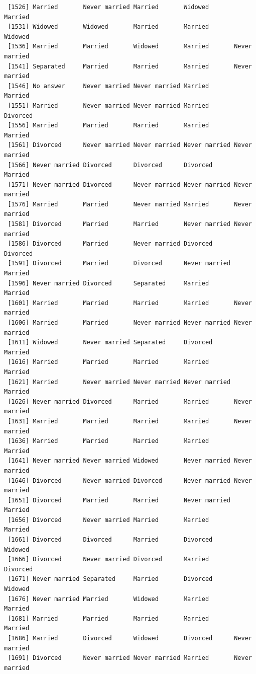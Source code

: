 \documentclass[
  letterpaper,
  DIV=11,
  numbers=noendperiod,
  oneside]{scrartcl}
\begin{document}
\begin{verbatim}
 [1526] Married       Never married Married       Widowed       Married      
 [1531] Widowed       Widowed       Married       Married       Widowed      
 [1536] Married       Married       Widowed       Married       Never married
 [1541] Separated     Married       Married       Married       Never married
 [1546] No answer     Never married Never married Married       Married      
 [1551] Married       Never married Never married Married       Divorced     
 [1556] Married       Married       Married       Married       Married      
 [1561] Divorced      Never married Never married Never married Never married
 [1566] Never married Divorced      Divorced      Divorced      Married      
 [1571] Never married Divorced      Never married Never married Never married
 [1576] Married       Married       Never married Married       Never married
 [1581] Divorced      Married       Married       Never married Never married
 [1586] Divorced      Married       Never married Divorced      Divorced     
 [1591] Divorced      Married       Divorced      Never married Married      
 [1596] Never married Divorced      Separated     Married       Married      
 [1601] Married       Married       Married       Married       Never married
 [1606] Married       Married       Never married Never married Never married
 [1611] Widowed       Never married Separated     Divorced      Married      
 [1616] Married       Married       Married       Married       Married      
 [1621] Married       Never married Never married Never married Married      
 [1626] Never married Divorced      Married       Married       Never married
 [1631] Married       Married       Married       Married       Never married
 [1636] Married       Married       Married       Married       Married      
 [1641] Never married Never married Widowed       Never married Never married
 [1646] Divorced      Never married Divorced      Never married Never married
 [1651] Divorced      Married       Married       Never married Married      
 [1656] Divorced      Never married Married       Married       Married      
 [1661] Divorced      Divorced      Married       Divorced      Widowed      
 [1666] Divorced      Never married Divorced      Married       Divorced     
 [1671] Never married Separated     Married       Divorced      Widowed      
 [1676] Never married Married       Widowed       Married       Married      
 [1681] Married       Married       Married       Married       Married      
 [1686] Married       Divorced      Widowed       Divorced      Never married
 [1691] Divorced      Never married Never married Married       Never married

\end{verbatim}
\end{document}
